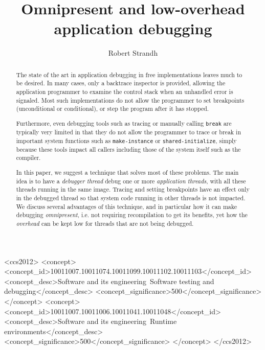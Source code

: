 \documentclass[format=sigconf]{acmart}
\begin{document}
\title{Omnipresent and low-overhead application debugging}

\author{Robert Strandh}


\begin{abstract}
The state of the art in application debugging in free \commonlisp{}
implementations leaves much to be desired.  In many cases, only a
backtrace inspector is provided, allowing the application programmer
to examine the control stack when an unhandled error is signaled.
Most such implementations do not allow the programmer to set
breakpoints (unconditional or conditional), or step the program after
it has stopped.

Furthermore, even debugging tools such as tracing or manually calling
\texttt{break} are typically very limited in that they do not allow
the programmer to trace or break in important system functions such as
\texttt{make-instance} or \texttt{shared-initialize}, simply because
these tools impact all callers including those of the system itself
such as the compiler.

In this paper, we suggest a technique that solves most of these
problems.  The main idea is to have a \emph{debugger thread} debug one
or more \emph{application threads}, with all these threads running in
the same image.  Tracing and setting breakpoints have an effect only
in the debugged thread so that system code running in other threads is
not impacted.  We discuss several advantages of this technique, and in
particular how it can make debugging \emph{omnipresent}, i.e. not
requiring recompilation to get its benefits, yet how the
\emph{overhead} can be kept low for threads that are not being
debugged.
\end{abstract}


\begin{CCSXML}
<ccs2012>
<concept>
<concept_id>10011007.10011074.10011099.10011102.10011103</concept_id>
<concept_desc>Software and its engineering~Software testing and debugging</concept_desc>
<concept_significance>500</concept_significance>
</concept>
<concept>
<concept_id>10011007.10011006.10011041.10011048</concept_id>
<concept_desc>Software and its engineering~Runtime environments</concept_desc>
<concept_significance>500</concept_significance>
</concept>
</ccs2012>
\end{CCSXML}
\end{document}
